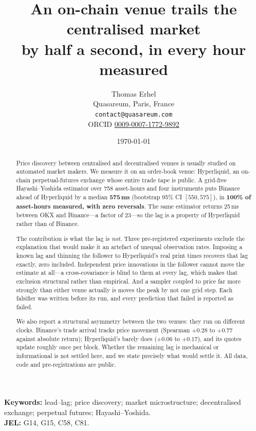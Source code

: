 \documentclass[11pt,a4paper]{article}
\title{\bfseries An on-chain venue trails the centralised market\\
by half a second, in every hour measured}
\author{Thomas Erhel\\ \small Quasareum, Paris, France\\ \small \texttt{contact@quasareum.com}\\
  \small ORCID \href{https://orcid.org/0009-0007-1772-9892}{0009-0007-1772-9892}}
\date{\today}
\begin{document}
\maketitle
\sloppy

\renewcommand{\thefootnote}{}
\renewcommand{\thefootnote}{\arabic{footnote}}

\begin{abstract}
\noindent
Price discovery between centralised and decentralised venues is usually studied on automated
market makers. We measure it on an order-book venue: Hyperliquid, an on-chain perpetual-futures
exchange whose entire trade tape is public. A grid-free Hayashi--Yoshida estimator over 758
asset-hours and four instruments puts Binance ahead of Hyperliquid by a median \textbf{575\,ms}
(bootstrap 95\% CI $[550, 575]$), in \textbf{100\% of asset-hours measured, with zero reversals}.
The same estimator returns 25\,ms between OKX and Binance---a factor of 23---so the lag is a
property of Hyperliquid rather than of Binance.

The contribution is what the lag is \emph{not}. Three pre-registered experiments exclude the
explanation that would make it an artefact of unequal observation rates. Imposing a known lag and
thinning the follower to Hyperliquid's real print times recovers that lag exactly, zero included.
Independent price innovations in the follower cannot move the estimate at all---a cross-covariance
is blind to them at every lag, which makes that exclusion structural rather than empirical. And a
sampler coupled to price far more strongly than either venue actually is moves the peak by not one
grid step. Each falsifier was written before its run, and every prediction that failed is reported
as failed.

We also report a structural asymmetry between the two venues: they run on different clocks.
Binance's trade arrival tracks price movement (Spearman $+0.28$ to $+0.77$ against absolute
return); Hyperliquid's barely does ($+0.06$ to $+0.17$), and its quotes update roughly once per
block. Whether the remaining lag is mechanical or informational is not settled here, and we state
precisely what would settle it. All data, code and pre-registrations are public.
\end{abstract}

\medskip
\noindent\textbf{Keywords:} lead--lag; price discovery; market microstructure; decentralised
exchange; perpetual futures; Hayashi--Yoshida.\\
\textbf{JEL:} G14, G15, C58, C81.
\end{document}
